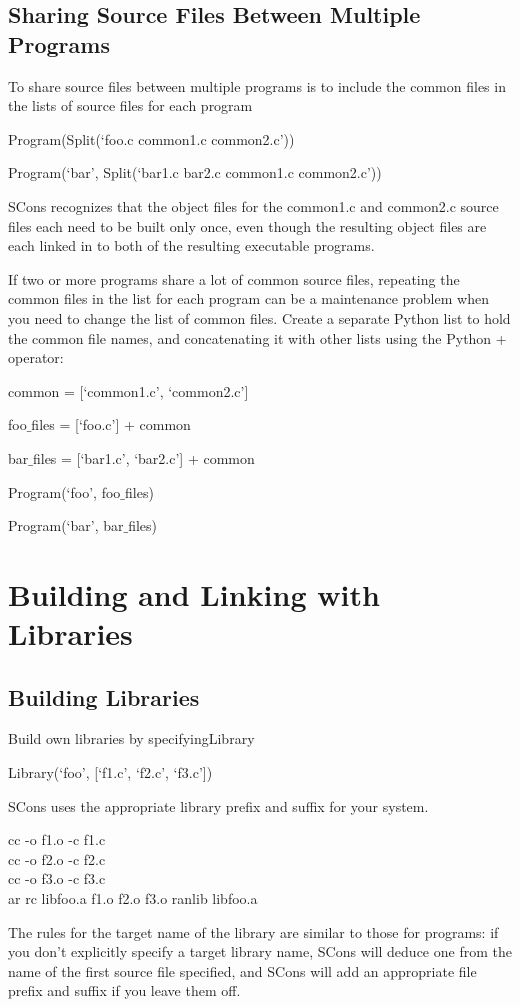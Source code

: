 \documentclass[12pt,a4paper]{article}
\begin{document}
\subsection{Sharing Source Files Between Multiple Programs}
To share source files between multiple programs is to include the common files in the lists of source files for each program

Program(Split(`foo.c common1.c common2.c'))

Program(`bar', Split(`bar1.c bar2.c common1.c common2.c'))

SCons recognizes that the object files for the common1.c and common2.c source files each need to be built only once, even though the resulting object files are each linked in to both of the resulting executable programs.

If two or more programs share a lot of common source files, repeating the common files in the list for each program can be a maintenance problem when you need to change the list of common files. Create a separate Python list to hold the common file names, and concatenating it with other lists using the Python + operator:

common = [`common1.c', `common2.c']

foo$\_$files = [`foo.c'] + common

bar$\_$files = [`bar1.c', `bar2.c'] + common

Program(`foo', foo$\_$files)

Program(`bar', bar$\_$files)

\section{Building and Linking with Libraries}

\subsection{Building Libraries}
Build own libraries by specifyingLibrary

Library(`foo', [`f1.c', `f2.c', `f3.c'])

SCons uses the appropriate library prefix and suffix for your system.

cc -o f1.o -c f1.c \\
cc -o f2.o -c f2.c \\
cc -o f3.o -c f3.c \\
ar rc libfoo.a f1.o f2.o f3.o ranlib libfoo.a

The rules for the target name of the library are similar to those for programs: if you don't explicitly specify a target library name, SCons will deduce one from the name of the first source file specified, and SCons will add an appropriate file prefix and suffix if you leave them off.
\end{document}
